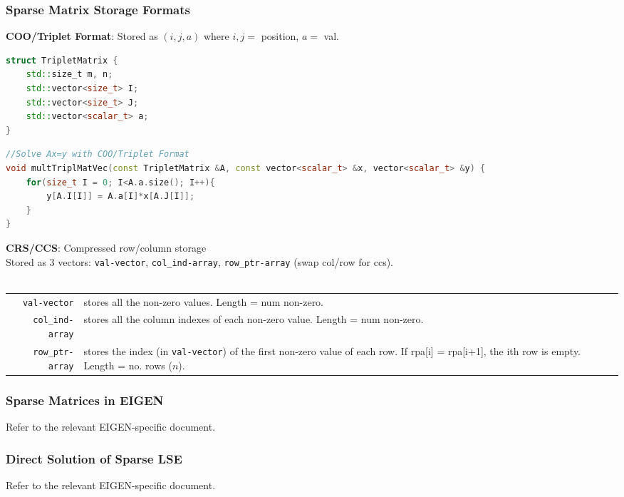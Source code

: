 \documentclass[12pt]{article}
\begin{document}
\subsubsection{Sparse Matrix Storage Formats}
\textbf{COO/Triplet Format}: Stored as $(i, j, a)$ where $i, j =$ position, $a=$ val.
\begin{lstlisting}[language=c++]
struct TripletMatrix {
	std::size_t m, n;
	std::vector<size_t> I;
	std::vector<size_t> J;
	std::vector<scalar_t> a;
}
\end{lstlisting}
\begin{lstlisting}[language=c++]
//Solve Ax=y with COO/Triplet Format
void multTriplMatVec(const TripletMatrix &A, const vector<scalar_t> &x, vector<scalar_t> &y) {
	for(size_t I = 0; I<A.a.size(); I++){
		y[A.I[I]] = A.a[I]*x[A.J[I]];
	}
}
\end{lstlisting}
\textbf{CRS/CCS}: Compressed row/column storage\\
Stored as 3 vectors: \texttt{val-vector}, \texttt{col\_ind-array}, \texttt{row\_ptr-array} (swap col/row for ccs).\\\\
\begin{tabularx}{\linewidth}{r X}
\texttt{val-vector} & stores all the non-zero values. Length = num non-zero.\\
\texttt{col\_ind-array} & stores all the column indexes of each non-zero value. Length = num non-zero.\\
\texttt{row\_ptr-array} & stores the index (in \texttt{val-vector}) of the first non-zero value of each row. If rpa[i] = rpa[i+1], the ith row is empty. Length = no. rows ($n$).
\end{tabularx}
\subsubsection{Sparse Matrices in EIGEN}
Refer to the relevant EIGEN-specific document.
\subsubsection{Direct Solution of Sparse LSE}
Refer to the relevant EIGEN-specific document.
\subsubsection{}
\subsubsection{}
\subsection{}
\end{document}
